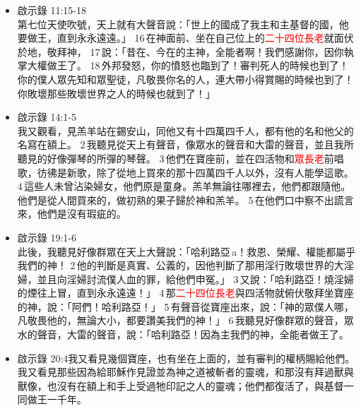 \begin{itemize}
此後我觀看，見有許多的人，沒有人能數過來，是從各國、各族、各民、各方來的，站在寶座和羔羊面前，身穿白衣，手拿棕樹枝， 10 大聲喊著說：「願救恩歸於坐在寶座上我們的神，也歸於羔羊！」 11 眾天使都站在寶座和\textcolor{red}{眾長老}並四活物的周圍，在寶座前面伏於地，敬拜神， 12 說：「阿們！頌讚、榮耀、智慧、感謝、尊貴、權柄、大力都歸於我們的神，直到永永遠遠！阿們。」\textcolor{red}{长老}中有一位问我：「这些身穿白袍的是谁？他们是从哪里来的呢？」 14我对他说：「我主啊，你是知道的。」他告诉我：「这些人是从大患难中出来的。他们用羊羔的血，把自己的衣袍洗洁白了。 15因此，他们可以在　神的宝座前，并且日夜在他的圣所里事奉他。那坐在宝座上的必展开帐幕覆庇他们。 16他们必不再饿，也不再渴；太阳和一切炎热必不伤害他们。 17因为在宝座中间的羊羔必牧养他们，领他们到生命水的泉源那里。　神也必抹去他们的一切眼泪。」
\item 啟示錄 11:15-18\\
第七位天使吹號，天上就有大聲音說：「世上的國成了我主和主基督的國，他要做王，直到永永遠遠。」 16 在神面前、坐在自己位上的\textcolor{red}{二十四位長老}就面伏於地，敬拜神， 17 說：「昔在、今在的主神，全能者啊！我們感謝你，因你執掌大權做王了。 18 外邦發怒，你的憤怒也臨到了！審判死人的時候也到了！你的僕人眾先知和眾聖徒，凡敬畏你名的人，連大帶小得賞賜的時候也到了！你敗壞那些敗壞世界之人的時候也就到了！」
\item 啟示錄 14:1-5\\
我又觀看，見羔羊站在錫安山，同他又有十四萬四千人，都有他的名和他父的名寫在額上。 2 我聽見從天上有聲音，像眾水的聲音和大雷的聲音，並且我所聽見的好像彈琴的所彈的琴聲。 3 他們在寶座前，並在四活物和\textcolor{red}{眾長老}前唱歌，彷彿是新歌，除了從地上買來的那十四萬四千人以外，沒有人能學這歌。 4 這些人未曾沾染婦女，他們原是童身。羔羊無論往哪裡去，他們都跟隨他。他們是從人間買來的，做初熟的果子歸於神和羔羊。 5 在他們口中察不出謊言來，他們是沒有瑕疵的。
\item 啟示錄 19:1-6\\
此後，我聽見好像群眾在天上大聲說：「哈利路亞 a！救恩、榮耀、權能都屬乎我們的神！ 2 他的判斷是真實、公義的，因他判斷了那用淫行敗壞世界的大淫婦，並且向淫婦討流僕人血的罪，給他們申冤。」 3 又說：「哈利路亞！燒淫婦的煙往上冒，直到永永遠遠！」 4 那\textcolor{red}{二十四位長老}與四活物就俯伏敬拜坐寶座的神，說：「阿們！哈利路亞！」 5 有聲音從寶座出來，說：「神的眾僕人哪，凡敬畏他的，無論大小，都要讚美我們的神！」 6 我聽見好像群眾的聲音，眾水的聲音，大雷的聲音，說：「哈利路亞！因為主我們的神，全能者做王了。
\item 啟示錄 20:4我又看見幾個寶座，也有坐在上面的，並有審判的權柄賜給他們。我又看見那些因為給耶穌作見證並為神之道被斬者的靈魂，和那沒有拜過獸與獸像，也沒有在額上和手上受過牠印記之人的靈魂；他們都復活了，與基督一同做王一千年。 
\end{itemize}
